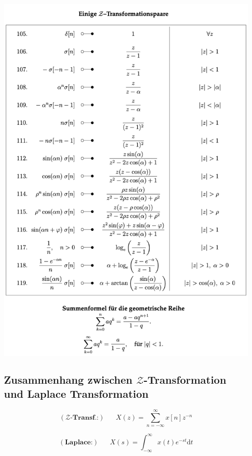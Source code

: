 \documentclass[11pt]{article}
\begin{document}
\vfill \null
\pagebreak

\begin{center}
    \includegraphics[width=0.9\linewidth]{docimgs/Z-Transformationspaare.png}
\end{center}

\pagebreak

\subsection*{Zusammenhang zwischen $\mathcal{Z}$-Transformation und Laplace Transformation}
\vspace*{-1cm}
\noindent
\begin{minipage}[t]{0.45\textwidth}
    $$(\textbf{$\mathcal{Z}$-Transf.:}) \hspace{20pt} X(z) = \sum_{n=-\infty}^\infty x[n] z^{-n}$$
\end{minipage}
\hfill
\begin{minipage}[t]{0.45\textwidth}
    $$(\textbf{Laplace:}) \hspace{20pt} X(s) = \int_{-\infty}^\infty x(t) e^{-st} \text{d}t$$
\end{minipage}
\end{document}
